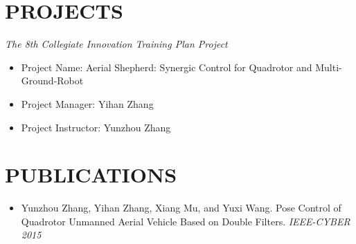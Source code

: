\documentclass[margin, 10pt]{res} %
\begin{document}
\begin{resume}
\section{PROJECTS}
{\sl The 8th Collegiate Innovation Training Plan Project} \\
\begin{itemize}
\item Project Name: Aerial Shepherd: Synergic Control for Quadrotor and Multi-Ground-Robot
\item Project Manager: Yihan Zhang
\item Project Instructor: Yunzhou Zhang
\end{itemize}

\section{PUBLICATIONS}
\begin{itemize}
\item Yunzhou Zhang, Yihan Zhang, Xiang Mu, and Yuxi Wang. Pose Control of Quadrotor Unmanned Aerial Vehicle Based on Double Filters. {\sl IEEE-CYBER 2015} 
\end{itemize}


\end{resume}
\end{document}
